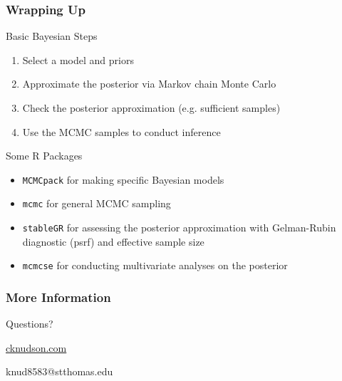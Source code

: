 \documentclass{beamer}
\begin{document}
\begin{frame}
\frametitle{Wrapping Up}



\begin{block}{Basic Bayesian Steps}

\begin{enumerate}
\item Select a model and priors
\item Approximate the posterior via Markov chain Monte Carlo
\item Check the posterior approximation (e.g. sufficient samples)
\item Use the MCMC samples to conduct inference 
 \end{enumerate}
\end{block}

\pause

\vspace{.5cm}

\begin{block}{Some R Packages}

\begin{itemize}
\item \texttt{MCMCpack} for making specific Bayesian models
\item \texttt{mcmc} for general MCMC sampling
\item \texttt{stableGR} for assessing the posterior approximation with Gelman-Rubin diagnostic (psrf) and effective sample size
\item \texttt{mcmcse} for conducting multivariate analyses on the posterior
\end{itemize}
\end{block}


\end{frame}

\begin{frame}
\frametitle{More Information}

\begin{center}

\vspace{.5cm}

{\huge{Questions?}} \\

\vspace{1cm}

{\large{\url{cknudson.com}}}\\

\vspace{.5cm}




knud8583@stthomas.edu \\


\vspace{2cm} 

\end{center}

\end{frame}
\end{document}
